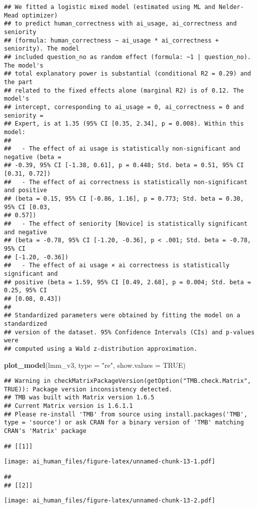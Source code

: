 \documentclass[
]{article}
\newenvironment{Shaded}{\begin{snugshade}}{\end{snugshade}}
\newcommand{\AttributeTok}[1]{\textcolor[rgb]{0.13,0.29,0.53}{#1}}
\newcommand{\ConstantTok}[1]{\textcolor[rgb]{0.56,0.35,0.01}{#1}}
\newcommand{\FunctionTok}[1]{\textcolor[rgb]{0.13,0.29,0.53}{\textbf{#1}}}
\newcommand{\NormalTok}[1]{#1}
\newcommand{\StringTok}[1]{\textcolor[rgb]{0.31,0.60,0.02}{#1}}
\begin{document}
\begin{verbatim}
## We fitted a logistic mixed model (estimated using ML and Nelder-Mead optimizer)
## to predict human_correctness with ai_usage, ai_correctness and seniority
## (formula: human_correctness ~ ai_usage * ai_correctness + seniority). The model
## included question_no as random effect (formula: ~1 | question_no). The model's
## total explanatory power is substantial (conditional R2 = 0.29) and the part
## related to the fixed effects alone (marginal R2) is of 0.12. The model's
## intercept, corresponding to ai_usage = 0, ai_correctness = 0 and seniority =
## Expert, is at 1.35 (95% CI [0.35, 2.34], p = 0.008). Within this model:
## 
##   - The effect of ai usage is statistically non-significant and negative (beta =
## -0.39, 95% CI [-1.38, 0.61], p = 0.448; Std. beta = 0.51, 95% CI [0.31, 0.72])
##   - The effect of ai correctness is statistically non-significant and positive
## (beta = 0.15, 95% CI [-0.86, 1.16], p = 0.773; Std. beta = 0.30, 95% CI [0.03,
## 0.57])
##   - The effect of seniority [Novice] is statistically significant and negative
## (beta = -0.78, 95% CI [-1.20, -0.36], p < .001; Std. beta = -0.78, 95% CI
## [-1.20, -0.36])
##   - The effect of ai usage × ai correctness is statistically significant and
## positive (beta = 1.59, 95% CI [0.49, 2.68], p = 0.004; Std. beta = 0.25, 95% CI
## [0.08, 0.43])
## 
## Standardized parameters were obtained by fitting the model on a standardized
## version of the dataset. 95% Confidence Intervals (CIs) and p-values were
## computed using a Wald z-distribution approximation.
\end{verbatim}

\begin{Shaded}
\begin{Highlighting}[]
\FunctionTok{plot\_model}\NormalTok{(lmm\_v3, }\AttributeTok{type =} \StringTok{"re"}\NormalTok{, }\AttributeTok{show.values =} \ConstantTok{TRUE}\NormalTok{)}
\end{Highlighting}
\end{Shaded}

\begin{verbatim}
## Warning in checkMatrixPackageVersion(getOption("TMB.check.Matrix", TRUE)): Package version inconsistency detected.
## TMB was built with Matrix version 1.6.5
## Current Matrix version is 1.6.1.1
## Please re-install 'TMB' from source using install.packages('TMB', type = 'source') or ask CRAN for a binary version of 'TMB' matching CRAN's 'Matrix' package
\end{verbatim}

\begin{verbatim}
## [[1]]
\end{verbatim}

\texttt{[image: ai\_human\_files/figure-latex/unnamed-chunk-13-1.pdf]}

\begin{verbatim}
## 
## [[2]]
\end{verbatim}

\texttt{[image: ai\_human\_files/figure-latex/unnamed-chunk-13-2.pdf]}
\end{document}
